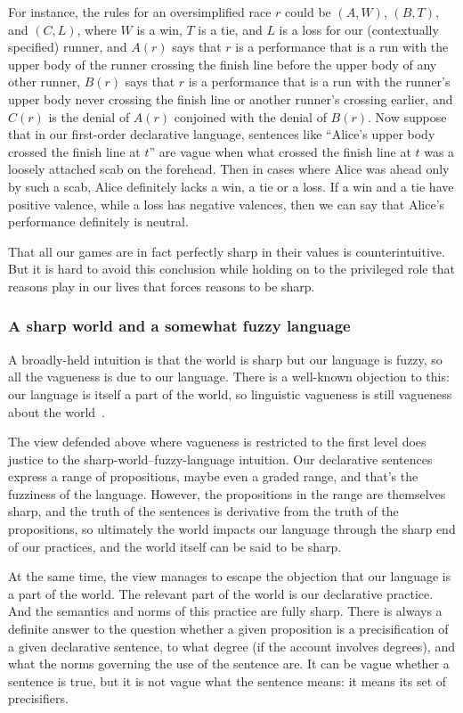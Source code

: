 For instance, the rules for an oversimplified race $r$ could be $(A,W)$, $(B,T)$, and $(C,L)$, where $W$ is a win, $T$ is a tie, 
and $L$ is a loss for our (contextually specified) runner, and $A(r)$ says that $r$ is a performance that is a run with the upper body of the runner crossing the finish
line before the upper body of any other runner, $B(r)$ says that $r$ is a performance that is a run with the runner's upper body never
crossing the finish line or another runner's crossing earlier, and $C(r)$ is the denial of $A(r)$ conjoined with the denial of $B(r)$.
Now suppose that in our first-order declarative language, sentences like ``Alice's upper body crossed the finish line at $t$'' are vague
when what crossed the finish line at $t$ was a loosely attached scab on the forehead. Then in cases where Alice was ahead only by such
a scab, Alice definitely lacks a win, a tie or a loss. If a win and a tie have positive valence, while a loss has negative valences, then
we can say that Alice's performance definitely is neutral.

That all our games are in fact perfectly sharp in their values is counterintuitive. But it is hard to avoid this conclusion while holding 
on to the privileged role that reasons play in our lives that forces reasons to be sharp.

\subsubsection{A sharp world and a somewhat fuzzy language}\label{sec:somewhat-fuzzy}
A broadly-held intuition is that the world is sharp but our language is fuzzy, so all the vagueness is due to our language.
There is a well-known objection to this: our language is itself a part of the world, so linguistic vagueness is still vagueness
about the world~\parencite{MerricksVV}.

The view defended above where vagueness is restricted to the first level does justice to the sharp-world--fuzzy-language intuition. 
Our declarative sentences express a range of propositions, maybe even a graded range, and that's the 
fuzziness of the language. However, the propositions in the range are themselves sharp, and the truth of the sentences is
derivative from the truth of the propositions, so ultimately the world impacts our language through the sharp end of our
practices, and the world itself can be said to be sharp. 

At the same time, the view manages to escape the objection that our language is a part of the world. The relevant part of the world
is our declarative practice. And the semantics and norms of this practice are fully sharp. There is always a definite answer to 
the question whether a given proposition is a precisification of a given declarative sentence, to what degree (if the account 
involves degrees), and what the norms governing the use of the sentence are. It can be vague whether a sentence is true, but it 
is not vague what the sentence means: it means its set of precisifiers. 

